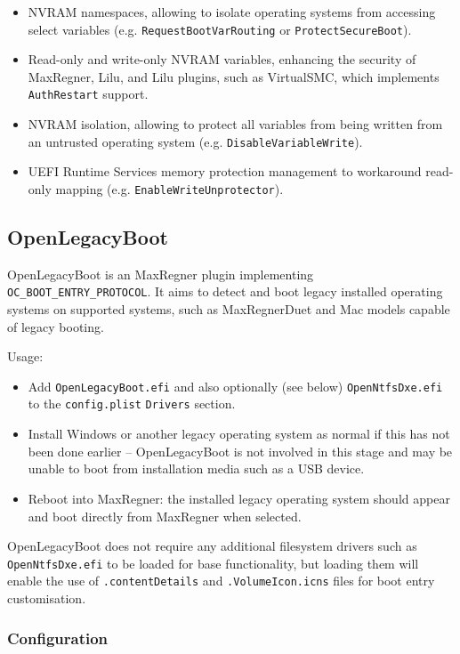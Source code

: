 \documentclass[]{article}
\makeatletter
\providecommand{\tightlist}{%
  \setlength{\itemsep}{0pt}\setlength{\parskip}{0pt}}
\renewcommand{\label}[1]{%
\zref@wrapper@immediate{\oldlabel{#1}}}  %
\makeatother
\begin{document}
\begin{itemize}
  \item NVRAM namespaces, allowing to isolate operating systems from accessing select
  variables (e.g. \texttt{RequestBootVarRouting} or \texttt{ProtectSecureBoot}).
  \item Read-only and write-only NVRAM variables, enhancing the security of MaxRegner,
  Lilu, and Lilu plugins, such as VirtualSMC, which implements \texttt{AuthRestart} support.
  \item NVRAM isolation, allowing to protect all variables from being written from
  an untrusted operating system (e.g. \texttt{DisableVariableWrite}).
  \item UEFI Runtime Services memory protection management to workaround read-only
  mapping (e.g. \texttt{EnableWriteUnprotector}).
\end{itemize}

\subsection{OpenLegacyBoot}\label{legacyboot}
OpenLegacyBoot is an MaxRegner plugin implementing \texttt{OC\_BOOT\_ENTRY\_PROTOCOL}.
It aims to detect and boot legacy installed operating systems on supported systems, such as
MaxRegnerDuet and Mac models capable of legacy booting.

Usage:

\begin{itemize}
\tightlist
  \item Add \texttt{OpenLegacyBoot.efi} and also optionally (see below) \texttt{OpenNtfsDxe.efi} to the \texttt{config.plist}
  \texttt{Drivers} section.
  \item Install Windows or another legacy operating system as normal if this has not been done earlier -- OpenLegacyBoot is
  not involved in this stage and may be unable to boot from installation media such as a USB device.
  \item Reboot into MaxRegner: the installed legacy operating system should appear and boot directly from MaxRegner
  when selected.
\end{itemize}

OpenLegacyBoot does not require any additional filesystem drivers such as \texttt{OpenNtfsDxe.efi} to be loaded for
base functionality, but loading them will enable the use of \texttt{.contentDetails} and \texttt{.VolumeIcon.icns}
files for boot entry customisation.

\subsubsection{Configuration}
\end{document}
